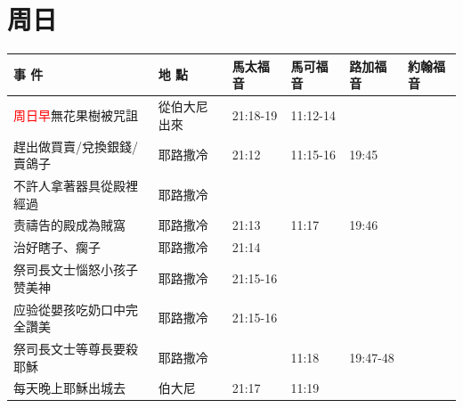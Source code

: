\section{周日}




\begin{table}[H]\centering
\begin{tabular}{p{14em}|p{7.93em}|l|l|l|p{4.855em}} \toprule
\textbf{事 件} & \textbf{地 點} & \multicolumn{1}{p{5.285em}|}{\textbf{馬太福音}} & \multicolumn{1}{p{5.57em}|}{\textbf{馬可福音}} & \multicolumn{1}{p{5.285em}|}{\textbf{路加福音}} & \textbf{約翰福音} \\  \midrule

\textcolor{red}{周日早}無花果樹被咒詛&從伯大尼出來& 21:18-19&11:12-14&&  \\\midrule

趕出做買賣/兌換銀錢/賣鴿子&耶路撒冷&21:12&  11:15-16 &19:45&  \\\midrule
不許人拿著器具從殿裡經過&耶路撒冷&&  &&  \\\midrule
责禱告的殿成為賊窩&耶路撒冷&  21:13  & 11:17&19:46&  \\\midrule
治好瞎子、瘸子&耶路撒冷&  21:14 &       &&  \\\midrule

祭司長文士惱怒小孩子赞美神&耶路撒冷&  21:15-16&&&  \\\midrule
应验從嬰孩吃奶口中完全讚美&耶路撒冷&21:15-16 &   && \\\midrule
祭司長文士等尊長要殺耶穌&耶路撒冷& & 11:18  &19:47-48&  \\\midrule
每天晚上耶穌出城去&伯大尼&21:17& 11:19&&  \\\midrule
 \end{tabular}%
\end{table}


